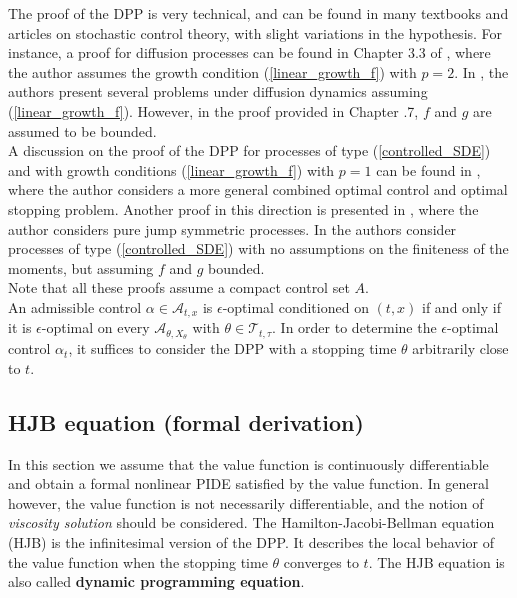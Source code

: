 The proof of the DPP is very technical, and can be found in many textbooks and articles on stochastic control theory, with slight variations in the hypothesis.   
For instance, a proof for diffusion processes can be found in Chapter 3.3 of \cite{Pham}, 
where the author assumes the growth condition (\ref{linear_growth_f}) with $p=2$. 
In \cite{FlemingSoner}, the authors present several problems under diffusion dynamics assuming (\ref{linear_growth_f}).
However, in the proof provided in Chapter .7, $f$ and $g$ are assumed to be bounded. \\ 
A discussion on the proof of the DPP for processes of type (\ref{controlled_SDE}) and with growth conditions (\ref{linear_growth_f}) with $p=1$ can be found in \cite{Ph98}, 
where the author considers a more general combined optimal control and optimal stopping problem. 
Another proof in this direction is presented in \cite{Zalin11}, where the author considers pure jump symmetric processes. 
In \cite{Gol16} the authors consider processes of type (\ref{controlled_SDE}) with no assumptions on the finiteness of the moments, but assuming $f$ and $g$ bounded.\\
Note that all these proofs assume a compact control set $A$.\\

An admissible control $\alpha \in \mathcal{A}_{t,x}$ is $\epsilon$-optimal conditioned on $(t,x)$ if and only if it is $\epsilon$-optimal 
on every $\mathcal{A}_{\theta, X_{\theta}}$ with 
$\theta \in \mathcal{T}_{t,\tau}$. In order to determine the $\epsilon$-optimal control $\alpha_t$, it suffices to consider the DPP with a stopping time $\theta$
arbitrarily close to $t$.

\subsection{HJB equation (formal derivation)}

In this section we assume that the value function is continuously differentiable and obtain a formal nonlinear PIDE satisfied by the value function.
In general however, the value function is not necessarily differentiable, and the notion of \emph{viscosity solution} should be considered.
The Hamilton-Jacobi-Bellman equation (HJB) is the infinitesimal version of the DPP. It describes the local behavior of the value function when the stopping time $\theta$ converges to $t$. 
The HJB equation is also called \textbf{dynamic programming equation}.
\newline

